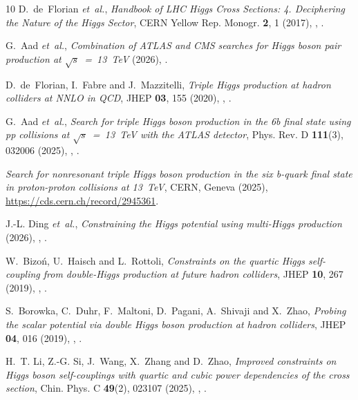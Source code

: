 \documentclass{SciPost}
\begin{document}
\begin{thebibliography}{10}
D.~de~Florian \emph{et~al.},
\newblock \emph{{Handbook of LHC Higgs Cross Sections: 4. Deciphering the Nature of the Higgs Sector}},
\newblock CERN Yellow Rep. Monogr. \textbf{2}, 1 (2017),
\newblock {},
\newblock {}.

G.~Aad \emph{et~al.},
\newblock \emph{{Combination of ATLAS and CMS searches for Higgs boson pair production at $\sqrt{s}$~=~13~TeV}}  (2026),
\newblock {}.

D.~de~Florian, I.~Fabre and J.~Mazzitelli,
\newblock \emph{{Triple Higgs production at hadron colliders at NNLO in QCD}},
\newblock JHEP \textbf{03}, 155 (2020),
\newblock {},
\newblock {}.

G.~Aad \emph{et~al.},
\newblock \emph{{Search for triple Higgs boson production in the 6b final state using pp collisions at $\sqrt{s}$~=~13~TeV with the ATLAS detector}},
\newblock Phys. Rev. D \textbf{111}(3), 032006 (2025),
\newblock {},
\newblock {}.

\emph{{Search for nonresonant triple Higgs boson production in the six b-quark final state in proton-proton collisions at 13~TeV}},
\newblock CERN, Geneva (2025),
\newblock \href{https://cds.cern.ch/record/2945361}{https://cds.cern.ch/record/2945361}.

J.-L. Ding \emph{et~al.},
\newblock \emph{{Constraining the Higgs potential using multi-Higgs production}}  (2026),
\newblock {},
\newblock {}.

W.~Bizo\'n, U.~Haisch and L.~Rottoli,
\newblock \emph{{Constraints on the quartic Higgs self-coupling from double-Higgs production at future hadron colliders}},
\newblock JHEP \textbf{10}, 267 (2019),
\newblock {},
\newblock {}.

S.~Borowka, C.~Duhr, F.~Maltoni, D.~Pagani, A.~Shivaji and X.~Zhao,
\newblock \emph{{Probing the scalar potential via double Higgs boson production at hadron colliders}},
\newblock JHEP \textbf{04}, 016 (2019),
\newblock {},
\newblock {}.

H.~T. Li, Z.-G. Si, J.~Wang, X.~Zhang and D.~Zhao,
\newblock \emph{{Improved constraints on Higgs boson self-couplings with quartic and cubic power dependencies of the cross section}},
\newblock Chin. Phys. C \textbf{49}(2), 023107 (2025),
\newblock {},
\newblock {}.


\end{thebibliography}
\end{document}
